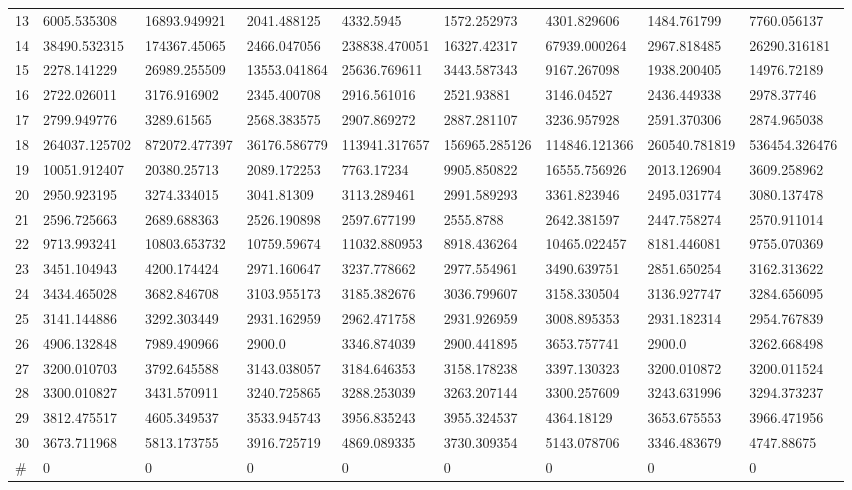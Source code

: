 \begin{table*}[t]
\begin{tabular}{|p{0.8cm}|p{1.6cm}|p{1.6cm}|p{1.6cm}|p{1.6cm}|p{1.6cm}|p{1.6cm}|p{1.6cm}|p{1.6cm}|}
13  & 6005.535308 & 16893.949921 & 2041.488125 & 4332.5945 & 1572.252973 & 4301.829606 & 1484.761799 & 7760.056137 \\ 
14  & 38490.532315 & 174367.45065 & 2466.047056 & 238838.470051 & 16327.42317 & 67939.000264 & 2967.818485 & 26290.316181 \\ 
15  & 2278.141229 & 26989.255509 & 13553.041864 & 25636.769611 & 3443.587343 & 9167.267098 & 1938.200405 & 14976.72189 \\ 
16  & 2722.026011 & 3176.916902 & 2345.400708 & 2916.561016 & 2521.93881 & 3146.04527 & 2436.449338 & 2978.37746 \\ 
17  & 2799.949776 & 3289.61565 & 2568.383575 & 2907.869272 & 2887.281107 & 3236.957928 & 2591.370306 & 2874.965038 \\ 
18  & 264037.125702 & 872072.477397 & 36176.586779 & 113941.317657 & 156965.285126 & 114846.121366 & 260540.781819 & 536454.326476 \\ 
19  & 10051.912407 & 20380.25713 & 2089.172253 & 7763.17234 & 9905.850822 & 16555.756926 & 2013.126904 & 3609.258962 \\ 
20  & 2950.923195 & 3274.334015 & 3041.81309 & 3113.289461 & 2991.589293 & 3361.823946 & 2495.031774 & 3080.137478 \\ 
21  & 2596.725663 & 2689.688363 & 2526.190898 & 2597.677199 & 2555.8788 & 2642.381597 & 2447.758274 & 2570.911014 \\ 
22  & 9713.993241 & 10803.653732 & 10759.59674 & 11032.880953 & 8918.436264 & 10465.022457 & 8181.446081 & 9755.070369 \\ 
23  & 3451.104943 & 4200.174424 & 2971.160647 & 3237.778662 & 2977.554961 & 3490.639751 & 2851.650254 & 3162.313622 \\ 
24  & 3434.465028 & 3682.846708 & 3103.955173 & 3185.382676 & 3036.799607 & 3158.330504 & 3136.927747 & 3284.656095 \\ 
25  & 3141.144886 & 3292.303449 & 2931.162959 & 2962.471758 & 2931.926959 & 3008.895353 & 2931.182314 & 2954.767839 \\ 
26  & 4906.132848 & 7989.490966 & 2900.0 & 3346.874039 & 2900.441895 & 3653.757741 & 2900.0 & 3262.668498 \\ 
27  & 3200.010703 & 3792.645588 & 3143.038057 & 3184.646353 & 3158.178238 & 3397.130323 & 3200.010872 & 3200.011524 \\ 
28  & 3300.010827 & 3431.570911 & 3240.725865 & 3288.253039 & 3263.207144 & 3300.257609 & 3243.631996 & 3294.373237 \\ 
29  & 3812.475517 & 4605.349537 & 3533.945743 & 3956.835243 & 3955.324537 & 4364.18129 & 3653.675553 & 3966.471956 \\ 
30  & 3673.711968 & 5813.173755 & 3916.725719 & 4869.089335 & 3730.309354 & 5143.078706 & 3346.483679 & 4747.88675 \\ 
\hline
\#  & 0 & 0 & 0 & 0 & 0 & 0 & 0 & 0 \\
\hline


\end{tabular}
\end{table*}

